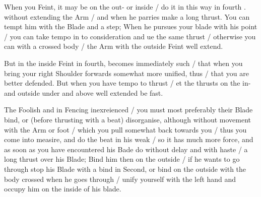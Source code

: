 When you Feint, it may be on the out- or inside / do it in this way in
fourth . without extending the Arm / and when he parries make a long
thrust. You can tempt him with the Blade and a step; When he pursues
your blade with his point / you can take tempo in to consideration and
ue the same thrust / otherwise you can with a crossed body / the Arm
with the outside Feint well extend.


But in the inside Feint in fourth, becomes immediately such / that
when you bring your right Shoulder forwards somewhat more unified,
thus / that you are better  defended. But when you have tempo to thrust / et the
thrusts on the in- and outside under and above well extended be fast.


The Foolish and in Fencing inexreienced / you must most preferably
their Blade bind, or (before thrusting with a beat) disorganise,
although without movement with the Arm or foot / which you pull
somewhat back towards you / thus you come into measire, and do the
beat in his weak / so it has much more force, and as soon as you have
encountered his Bade do without delay and with haste / a long thrust
over his Blade; Bind him then on the outside / if he wants to go
through stop his Blade with a bind in Second, or bind on the outside
with the body crossed when he goes through / unify yourself with the
left hand and occupy him on the inside of his blade.

